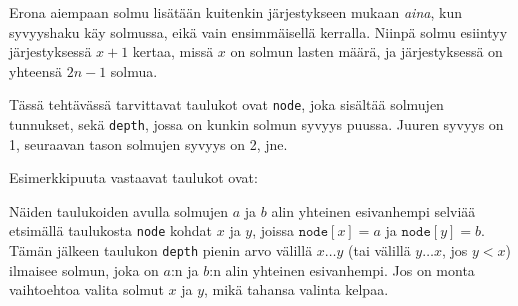 Erona aiempaan solmu lisätään kuitenkin järjestykseen
mukaan \textit{aina}, kun syvyyshaku käy solmussa,
eikä vain ensimmäisellä kerralla.
Niinpä solmu esiintyy järjestyksessä $x+1$ kertaa,
missä $x$ on solmun lasten määrä,
ja järjestyksessä on yhteensä $2n-1$ solmua.

Tässä tehtävässä tarvittavat taulukot ovat \texttt{node},
joka sisältää solmujen tunnukset,
sekä \texttt{depth}, jossa on kunkin solmun syvyys puussa.
Juuren syvyys on 1, seuraavan tason solmujen syvyys on 2, jne.

Esimerkkipuuta vastaavat taulukot ovat:

\begin{center}
\end{center}

Näiden taulukoiden avulla solmujen $a$ ja $b$ alin yhteinen esivanhempi
selviää etsimällä taulukosta \texttt{node}
kohdat $x$ ja $y$, joissa $\texttt{node}[x]=a$
ja $\texttt{node}[y]=b$.
Tämän jälkeen taulukon \texttt{depth}
pienin arvo välillä $x \ldots y$
(tai välillä $y \ldots x$, jos $y<x$)
ilmaisee solmun, joka on $a$:n ja $b$:n
alin yhteinen esivanhempi.
Jos on monta vaihtoehtoa valita solmut
$x$ ja $y$, mikä tahansa valinta kelpaa.

